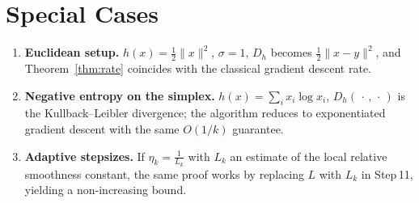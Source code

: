 \documentclass{article}
\newcommand{\D}[2]{D_{h}(#1,#2)}
\begin{document}
\section*{Special Cases}
\begin{enumerate}
\item \textbf{Euclidean setup.} $h(x)=\tfrac12\|x\|^{2}$, $\sigma=1$, $D_{h}$ becomes $\tfrac12\|x-y\|^{2}$, and Theorem~\ref{thm:rate} coincides with the classical gradient descent rate.
\item \textbf{Negative entropy on the simplex.} $h(x)=\sum_{i}x_i\log x_i$, $\D{\,\cdot\,}{\,\cdot\,}$ is the Kullback–Leibler divergence; the algorithm reduces to exponentiated gradient descent with the same $O(1/k)$ guarantee.
\item \textbf{Adaptive stepsizes.} If $\eta_k = \frac{1}{L_k}$ with $L_k$ an estimate of the local relative smoothness constant, the same proof works by replacing $L$ with $L_k$ in Step 11, yielding a non‑increasing bound.
\end{enumerate}
\end{document}
